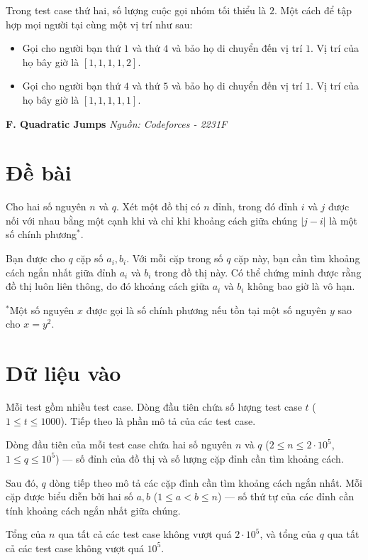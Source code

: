 \documentclass[12pt,a4paper]{article}
\newcommand{\problem}[2]{%
  \addcontentsline{toc}{section}{#1}%
  \begin{mdframed}[
    linecolor=framecolor,
    linewidth=1.5pt,
    backgroundcolor=white,
    topline=true, bottomline=true,
    leftline=true, rightline=true,
    innerleftmargin=10pt, innerrightmargin=10pt,
    innertopmargin=6pt, innerbottommargin=6pt,
  ]
  \textbf{\large #1} \hfill \textit{Nguồn: #2}
  \end{mdframed}
  \vspace{4pt}%
}
\begin{document}
Trong test case thứ hai, số lượng cuộc gọi nhóm tối thiểu là $2$. Một cách để tập hợp mọi người tại cùng một vị trí như sau:
\begin{itemize}
    \item Gọi cho người bạn thứ $1$ và thứ $4$ và bảo họ di chuyển đến vị trí $1$. Vị trí của họ bây giờ là $[1, 1, 1, 1, 2]$.
    \item Gọi cho người bạn thứ $4$ và thứ $5$ và bảo họ di chuyển đến vị trí $1$. Vị trí của họ bây giờ là $[1, 1, 1, 1, 1]$.
\end{itemize}

\newpage
\problem{F. Quadratic Jumps}{Codeforces - 2231F}

\section*{Đề bài}
Cho hai số nguyên $n$ và $q$. Xét một đồ thị có $n$ đỉnh, trong đó đỉnh $i$ và $j$ được nối với nhau bằng một cạnh khi và chỉ khi khoảng cách giữa chúng $|j - i|$ là một số chính phương$^*$.

Bạn được cho $q$ cặp số $a_i, b_i$. Với mỗi cặp trong số $q$ cặp này, bạn cần tìm khoảng cách ngắn nhất giữa đỉnh $a_i$ và $b_i$ trong đồ thị này. Có thể chứng minh được rằng đồ thị luôn liên thông, do đó khoảng cách giữa $a_i$ và $b_i$ không bao giờ là vô hạn.

$^*$Một số nguyên $x$ được gọi là số chính phương nếu tồn tại một số nguyên $y$ sao cho $x = y^2$.

\section*{Dữ liệu vào}
Mỗi test gồm nhiều test case. Dòng đầu tiên chứa số lượng test case $t$ ($1 \le t \le 1000$). Tiếp theo là phần mô tả của các test case.

Dòng đầu tiên của mỗi test case chứa hai số nguyên $n$ và $q$ ($2 \le n \le 2 \cdot 10^5$, $1 \le q \le 10^5$) — số đỉnh của đồ thị và số lượng cặp đỉnh cần tìm khoảng cách.

Sau đó, $q$ dòng tiếp theo mô tả các cặp đỉnh cần tìm khoảng cách ngắn nhất. Mỗi cặp được biểu diễn bởi hai số $a, b$ ($1 \leq a < b \leq n$) — số thứ tự của các đỉnh cần tính khoảng cách ngắn nhất giữa chúng.

\begin{constraintbox}
Tổng của $n$ qua tất cả các test case không vượt quá $2 \cdot 10^5$, và tổng của $q$ qua tất cả các test case không vượt quá $10^5$.
\end{constraintbox}
\end{document}
